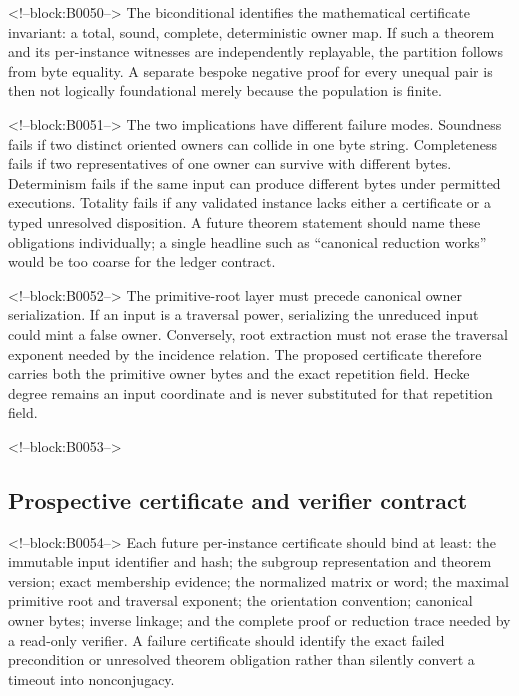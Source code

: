 \documentclass[11pt]{article}
\begin{document}
<!--block:B0050-->
The biconditional identifies the mathematical certificate invariant: a
total, sound, complete, deterministic owner map. If such a theorem and
its per-instance witnesses are independently replayable, the partition
follows from byte equality. A separate bespoke negative proof for every
unequal pair is then not logically foundational merely because the
population is finite.

<!--block:B0051-->
The two implications have different failure modes. Soundness fails if
two distinct oriented owners can collide in one byte string. Completeness
fails if two representatives of one owner can survive with different
bytes. Determinism fails if the same input can produce different bytes
under permitted executions. Totality fails if any validated instance
lacks either a certificate or a typed unresolved disposition. A future
theorem statement should name these obligations individually; a single
headline such as ``canonical reduction works'' would be too coarse for
the ledger contract.

<!--block:B0052-->
The primitive-root layer must precede canonical owner serialization.
If an input is a traversal power, serializing the unreduced input could
mint a false owner. Conversely, root extraction must not erase the
traversal exponent needed by the incidence relation. The proposed
certificate therefore carries both the primitive owner bytes and the
exact repetition field. Hecke degree remains an input coordinate and is
never substituted for that repetition field.

<!--block:B0053-->
\hypertarget{42-prospective-certificate-and-verifier-contract}{%
\subsection{Prospective certificate and verifier
contract}\label{42-prospective-certificate-and-verifier-contract}}

<!--block:B0054-->
Each future per-instance certificate should bind at least: the immutable
input identifier and hash; the subgroup representation and theorem
version; exact membership evidence; the normalized matrix or word; the
maximal primitive root and traversal exponent; the orientation
convention; canonical owner bytes; inverse linkage; and the complete
proof or reduction trace needed by a read-only verifier. A failure
certificate should identify the exact failed precondition or unresolved
theorem obligation rather than silently convert a timeout into
nonconjugacy.
\end{document}
